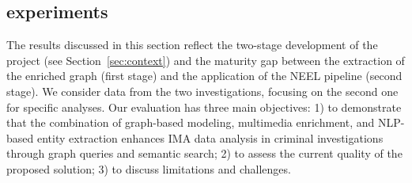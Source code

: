 
\subsection{experiments}

The results discussed in this section reflect the two-stage development of the project (see Section~\ref{sec:context}) and the maturity gap between the extraction of the enriched graph (first stage) and the application of the NEEL pipeline (second stage). We consider data from the two investigations, focusing on the second one for specific analyses.  
Our evaluation has three main objectives: 1) to demonstrate that the combination of graph-based modeling, multimedia enrichment, and NLP-based entity extraction enhances IMA data analysis in criminal investigations through graph queries and semantic search; 2) to assess the current quality of the proposed solution; 3) to discuss limitations and challenges.
      

